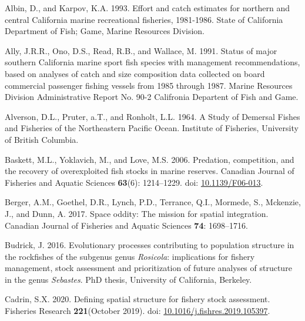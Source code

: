 \documentclass[
  english,
  a4paper,
]{article}
\newlength{\cslhangindent}
\newlength{\cslentryspacingunit} %
\newenvironment{CSLReferences}[2] %
 {%
  \setlength{\parindent}{0pt}
  \ifodd #1
  \let\oldpar\par
  \def\par{\hangindent=\cslhangindent\oldpar}
  \fi
  \setlength{\parskip}{#2\cslentryspacingunit}
 }%
 {}
\begin{document}
\hypertarget{refs}{}
\begin{CSLReferences}{1}{0}
\leavevmode{}%
Albin, D., and Karpov, K.A. 1993. {Effort and catch estimates for northern and central California marine recreational fisheries, 1981-1986}. State of California Department of Fish; Game, Marine Resources Division.

\leavevmode{}%
Ally, J.R.R., Ono, D.S., Read, R.B., and Wallace, M. 1991. {Status of major southern California marine sport fish species with management recommendations, based on analyses of catch and size composition data collected on board commercial passenger fishing vessels from 1985 through 1987}. Marine Resources Division Administrative Report No. 90-2 Califronia Departent of Fish and Game.

\leavevmode{}%
Alverson, D.L., Pruter, a.T., and Ronholt, L.L. 1964. {A Study of Demersal Fishes and Fisheries of the Northeastern Pacific Ocean}. Institute of Fisheries, University of British Columbia.

\leavevmode{}%
Baskett, M.L., Yoklavich, M., and Love, M.S. 2006. {Predation, competition, and the recovery of overexploited fish stocks in marine reserves}. Canadian Journal of Fisheries and Aquatic Sciences \textbf{63}(6): 1214--1229. doi: \href{https://doi.org/10.1139/F06-013}{10.1139/F06-013}.

\leavevmode{}%
Berger, A.M., Goethel, D.R., Lynch, P.D., Terrance, Q.I., Mormede, S., Mckenzie, J., and Dunn, A. 2017. {Space oddity: The mission for spatial integration}. Canadian Journal of Fisheries and Aquatic Sciences \textbf{74}: 1698--1716.

\leavevmode{}%
Budrick, J. 2016. {Evolutionary processes contributing to population structure in the rockfishes of the subgenus genus \emph{Rosicola}: implications for fishery management, stock assessment and prioritization of future analyses of structure in the genus \emph{Sebastes}.} PhD thesis, University of California, Berkeley.

\leavevmode{}%
Cadrin, S.X. 2020. {Defining spatial structure for fishery stock assessment}. Fisheries Research \textbf{221}(October 2019). doi: \href{https://doi.org/10.1016/j.fishres.2019.105397}{10.1016/j.fishres.2019.105397}.


\end{CSLReferences}
\end{document}
